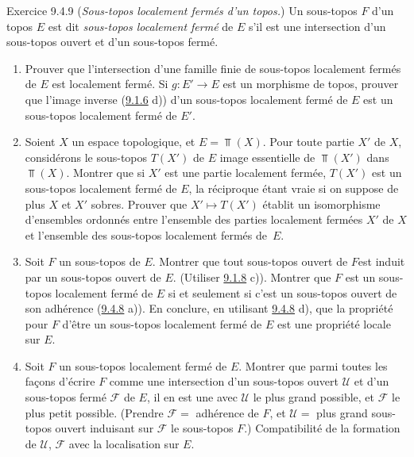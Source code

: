 \documentclass[10pt]{../fichiers-configuration-latex/smfart}
\begin{document}
\begin{enonce*}[remark]{Exercice 9.4.9}
(\emph{Sous-topos localement fermés d'un topos.}) Un sous-topos $F$
d'un topos $E$ est dit \emph{sous-topos localement fermé} de $E$
s'il est une intersection d'un sous-topos ouvert et d'un sous-topos
fermé.
\begin{enumerate}
\renewcommand{\theenumi}{\alph{enumi}}
\renewcommand{\labelenumi}{\theenumi)}
\item Prouver que l'intersection d'une famille finie de sous-topos
localement fermés de $E$ est localement fermé. Si $g:E'\rightarrow
E$ est un morphisme de topos, prouver que l'image inverse
(\hyperref[IV.exer9.1.6]{9.1.6} d)) d'un sous-topos localement fermé de $E$ est
un sous-topos localement fermé de $E'$.

\item Soient $X$ un espace topologique, et $E=\Top(X)$. Pour toute
partie $X'$ de $X$, considérons le sous-topos $T(X')$ de $E$ image
essentielle de $\Top(X')$ dans $\Top(X)$. Montrer que si $X'$ est
une partie localement fermée, $T(X')$ est un sous-topos localement
fermé de $E$, la réciproque étant vraie si on suppose de plus $X$ et
$X'$ sobres. Prouver que $X'\mapsto T(X')$ établit un isomorphisme
d'ensembles ordonnés entre l'ensemble des parties localement fermées
$X'$ de $X$ et l'ensemble des sous-topos localement fermés de~$E$.

\item Soit $F$ un sous-topos de $E$. Montrer que tout sous-topos ouvert
de $F$\pageoriginale est induit par un sous-topos ouvert de $E$.
(Utiliser \hyperref[IV.exer9.1.8]{9.1.8} c)). Montrer que $F$ est un sous-topos
localement fermé de $E$ si et seulement si c'est un sous-topos
ouvert de son adhérence (\hyperref[IV.exer9.4.8]{9.4.8} a)). En conclure, en
utilisant \hyperref[IV.exer9.4.8]{9.4.8} d), que la propriété pour $F$
d'être un
sous-topos localement fermé de $E$ est une propriété
locale sur $E$.

\item Soit $F$ un sous-topos localement fermé de $E$. Montrer que
parmi toutes les façons d'écrire $F$ comme une intersection d'un
sous-topos ouvert $\mathcal{U}$ et d'un sous-topos fermé
$\mathcal{F}$ de $E$, il en est une avec $\mathcal{U}$ le plus grand
possible, et $\mathcal{F}$ le plus petit possible. (Prendre
$\mathcal{F} =$ adhérence de $F$, et $\mathcal{U} =$ plus grand
sous-topos ouvert induisant sur $\mathcal{F}$ le sous-topos $F$.)
Compatibilité de la formation de $\mathcal{U}$, $\mathcal{F}$ avec
la localisation sur $E$.
\end{enumerate}
\end{enonce*}
\end{document}

